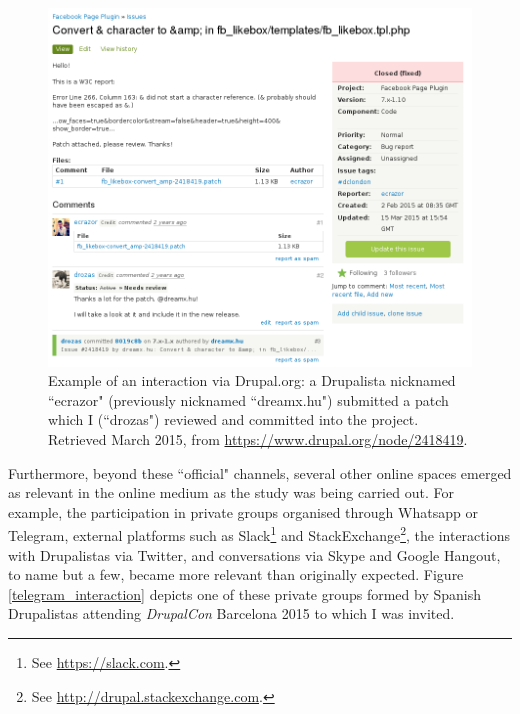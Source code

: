 \begin{figure}[H]
    \centering
    \includegraphics[scale=0.45]{img/tools/d_org_issue.png}
    \caption[Example of an interaction via Drupal.org]%
    {Example of an interaction via Drupal.org: a Drupalista nicknamed ``ecrazor" (previously nicknamed ``dreamx.hu") submitted a patch which I (``drozas") reviewed and committed into the project. Retrieved  March 2015, from \url{https://www.drupal.org/node/2418419}.}
    \label{d_org_interaction}
\end{figure}

Furthermore, beyond these ``official" channels, several other online spaces emerged as relevant in the online medium as the study was being carried out. For example, the participation in private groups organised through Whatsapp or Telegram, external platforms such as Slack\footnote{See \url{https://slack.com}.} and StackExchange\footnote{See \url{http://drupal.stackexchange.com}.}, the interactions with Drupalistas via Twitter, and conversations via Skype and Google Hangout, to name but a few, became more relevant than originally expected. Figure \ref{telegram_interaction} depicts one of these private groups formed by Spanish Drupalistas attending \textit{DrupalCon} Barcelona 2015 to which I was invited.

